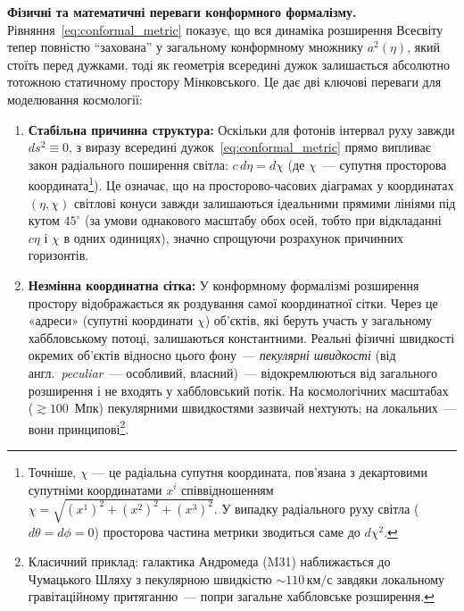 \noindent\textbf{Фізичні та математичні переваги конформного формалізму.}
Рівняння~\eqref{eq:conformal_metric} показує, що вся динаміка розширення Всесвіту тепер повністю \enquote{захована} у загальному конформному множнику $a^2(\eta)$, який стоїть перед дужками, тоді як геометрія всередині дужок залишається абсолютно тотожною статичному простору Мінковського. Це дає дві ключові переваги для моделювання космології:
\begin{enumerate}
    \item \textbf{Стабільна причинна структура:} Оскільки для фотонів інтервал руху завжди $ds^2 \equiv 0$, з виразу всередині дужок~\eqref{eq:conformal_metric} прямо випливає закон радіального поширення світла: $c\,d\eta = d\chi$ (де $\chi$~--- супутня просторова координата\footnote{Точніше, $\chi$ --- це радіальна супутня координата, пов'язана з декартовими супутніми координатами $x^i$ співвідношенням $\chi = \sqrt{(x^1)^2 + (x^2)^2 + (x^3)^2}$. У випадку радіального руху світла ($d\theta = d\phi = 0$) просторова частина метрики зводиться саме до $d\chi^2$.}). Це означає, що на просторово-часових діаграмах у координатах $(\eta, \chi)$ світлові конуси завжди залишаються ідеальними прямими лініями під кутом $45^\circ$ (за умови однакового масштабу обох осей, тобто при відкладанні $c\eta$ і $\chi$ в одних одиницях), значно спрощуючи розрахунок причинних горизонтів.
    \item \textbf{Незмінна координатна сітка:} У конформному формалізмі розширення простору відображається як роздування самої координатної сітки. Через це «адреси» (супутні координати $\chi$) об'єктів, які беруть участь у загальному хаббловському потоці, залишаються константними. Реальні фізичні швидкості окремих об'єктів відносно цього фону~--- \emph{пекулярні швидкості} (від англ.\ \textit{peculiar}~--- особливий, власний)~--- відокремлюються від загального розширення і не входять у хаббловський потік. На космологічних масштабах ($\gtrsim 100$~Мпк) пекулярними швидкостями зазвичай нехтують; на локальних~--- вони принципові\footnote{Класичний приклад: галактика Андромеда (M31) наближається до Чумацького Шляху з пекулярною швидкістю ${\sim}110\,\text{км/с}$ завдяки локальному гравітаційному притяганню~--- попри загальне хаббловське розширення.}.
\end{enumerate}



